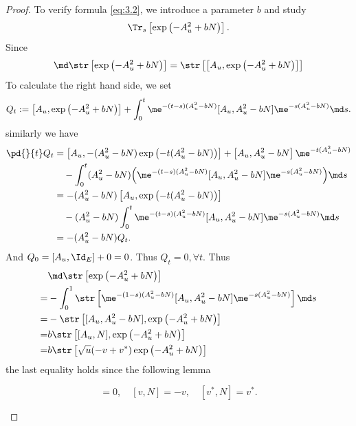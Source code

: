 \begin{proof}
    To verify formula \eqref{eq:3.2}, we introduce a parameter $b$ and study 
    \begin{equation*}
        \Tr_s\left[\exp\left(-A_u^2+bN\right)\right].
    \end{equation*}
    Since 
    \begin{equation*}
        \md\str\left[\exp\left(-A_u^2+bN\right)\right]
        =\str\left[\left[A_u,\exp\left(-A_u^2+bN\right)\right]\right]
    \end{equation*}
    To calculate the right hand side, we set 
    \begin{equation*}
        Q_t:=\left[A_u,\exp\left(-A_u^2+bN\right)\right] + 
        \int_0^t\me^{-(t-s)(A_u^2-bN)}[A_u,A_u^2-bN]
        \me^{-s(A_u^2-bN)}\md s.
    \end{equation*}
    similarly we have
    \begin{align*}
        \pd{}{t}Q_t &= \left[A_u,-(A_u^2-bN)\exp\left(-t(A_u^2-bN)\right)
        \right] + \left[A_u,A_u^2-bN\right]\me^{-t(A_u^2-bN)} \\
        &\quad-\int_0^t(A_u^2-bN)\Big(\me^{-(t-s)(A_u^2-bN)}
        [A_u,A_u^2-bN]\me^{-s(A_u^2-bN)}\Big)\md s \\
        &= -(A_u^2-bN)\left[A_u,\exp\left(-t(A_u^2-bN)\right)\right] \\
        &\quad-(A_u^2-bN)\int_0^t\me^{-(t-s)(A_u^2-bN)}
        [A_u,A_u^2-bN]\me^{-s(A_u^2-bN)}\md s \\
        &= -(A_u^2-bN)Q_t.
    \end{align*}
    And $Q_0=[A_u,\Id_E] +0=0$. Thus $Q_t=0, \forall t$. Thus 
    \begin{align*}
        &\md\str\left[\exp\left(-A_u^2+bN\right)\right] \\
        =& -\int_0^1\str\left[\me^{-(1-s)(A_u^2-bN)}
        [A_u,A_u^2-bN]\me^{-s(A_u^2-bN)}\right]\md s \\
        =& -\str\left[[A_u,A_u^2-bN],\exp\left(-A_u^2+bN\right)\right] \\
        =& b\str\left[[A_u,N],\exp\left(-A_u^2+bN\right)\right] \\
        =& b\str\left[\sqrt{u}(-v+v^*)\exp\left(-A_u^2+bN\right)\right] 
    \end{align*}
    the last equality holds since the following lemma 
    \begin{lemma}
        \begin{equation*}
        [\nabla^E,N] = 0,\quad [v,N] = -v,\quad [v^*,N] = v^*.
        \end{equation*}

\end{lemma}
\end{proof}
